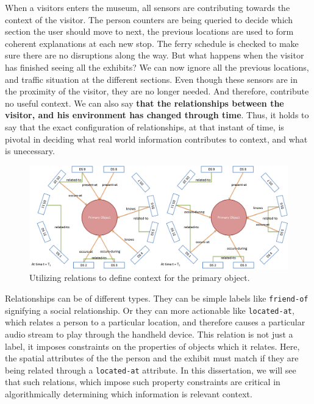 When a visitors enters the museum, all sensors are contributing towards the context of the visitor. The person counters are being queried to decide which section the user should move to next, the previous locations are used to form coherent explanations at each new stop. The ferry schedule is checked to make sure there are no disruptions along the way. But what happens when the visitor has finished seeing all the exhibits? We can now ignore all the previous locations, and traffic situation at the different sections. Even though these sensors are in the proximity of the visitor, they are no longer needed. And therefore, contribute no useful context. We can also say \textbf{that the relationships between the visitor, and his environment has changed through time}. Thus, it holds to say that the exact configuration of relationships, at that instant of time, is pivotal in deciding what real world information contributes to context, and what is unecessary.

\begin{figure}[t]
\centering
\includegraphics[width=\textwidth]{media/chapter2/cn.png}
\caption{Utilizing relations to define context for the primary object.}
\label{fig:cn-def}
\end{figure}

Relationships can be of different types. They can be simple labels like \texttt{friend-of} signifying a social relationship. Or they can more actionable like \texttt{located-at}, which relates a person to a particular location, and therefore causes a particular audio stream to play through the handheld device. This relation is not just a label, it imposes constraints on the properties of objects which it relates. Here, the spatial attributes of the the person and the exhibit must match if they are being related through a \texttt{located-at} attribute. In this dissertation, we will see that such relations, which impose such property constraints are critical in algorithmically determining which information is relevant context.

